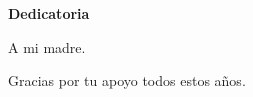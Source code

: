 \begin{center}
	{\large \bfseries  Dedicatoria}
\end{center}
\vspace{0.5cm}

A mi madre.

Gracias por tu apoyo todos estos años.
\newline

